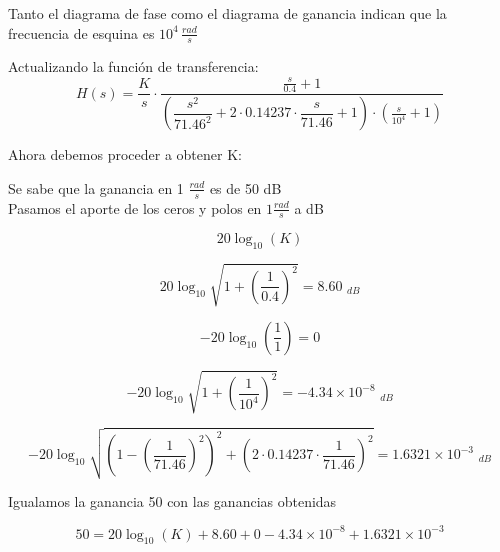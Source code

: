Tanto el diagrama de fase como el diagrama de ganancia indican 
que la frecuencia de esquina es $10^{4} \, \frac{rad}{s}$

Actualizando la función de transferencia:
\begin{equation*}
    H(s) = \dfrac{K}{s} \cdot \dfrac{\frac{s}{0{.}4} + 1}{
        \left(
            \dfrac{s^2}{71{.}46^2} 
            + 2\cdot 0{.}14237 \cdot \dfrac{s}{71{.}46} + 1 
        \right) \cdot (\frac{s}{10^4} + 1)
        }
\end{equation*}


Ahora debemos proceder a obtener K\@: \\

\newcommand{\frecuencia}{1}
\newcommand{\ganancia}{50}

Se sabe que la ganancia en {\frecuencia} $\frac{rad}{s}$ es de {\ganancia} dB
 \\

Pasamos el aporte de los ceros y polos en ${\frecuencia} \frac{rad}{s}$ a dB

\begin{equation*}
    20\log_{10}(K)
\end{equation*}

\begin{equation*}
     20\log_{10}\sqrt{1 + {(\frac{\frecuencia}{0{.}4})}^2}
     = 8{.}60\,\,_{dB} 
\end{equation*}

\begin{equation*}
    -20\log_{10}
    \left(
        \frac{1}{{\frecuencia}}
    \right) = 0
\end{equation*}


\begin{equation*}
     -20\log_{10}\sqrt{1 + {(\frac{\frecuencia}{10^4})}^2}
     = -4{.}34\times 10^{-8}\,\,_{dB} 
\end{equation*}

\begin{equation*}
    -20\log_{10}\sqrt{{\left(1-{(\frac{\frecuencia}{71{.}46})}^2\right)}^2 
    + {\left(2 \cdot 0{.}14237 \cdot \frac{\frecuencia}{71{.}46} \right)}^2}
    = 1{.}6321 \times 10^{-3}\,\,_{dB} 
\end{equation*}

Igualamos la ganancia {\ganancia} con las ganancias obtenidas

\begin{equation*}
    \ganancia = 20\log_{10}(K) 
    + 8{.}60 
    + 0 
    - 4{.}34\times 10^{-8} 
    + 1{.}6321 \times 10^{-3}
\end{equation*}

